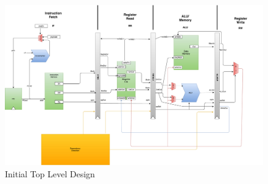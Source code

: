 \documentclass[conference]{IEEEtran}
\begin{document}
\clearpage

\begin{figure}
\centering
\includegraphics[scale=0.33]{DraftDesign.pdf}
\caption{Initial Top Level Design}
\label{Design Draft}
\end{figure}
\end{document}
